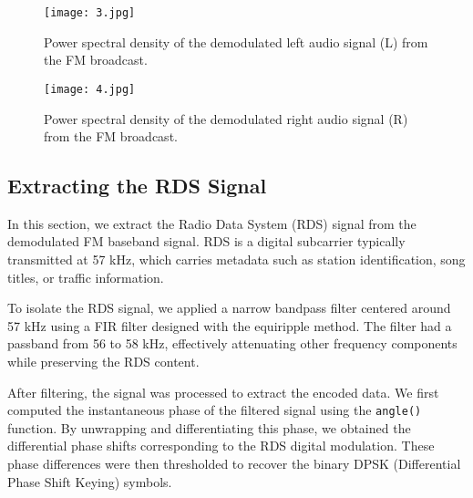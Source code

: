 \documentclass{article}
\begin{document}



\begin{figure}[h!]
    \centering
    \texttt{[image: 3.jpg]}
    \caption{Power spectral density of the demodulated left audio signal (L) from the FM broadcast.}
    \label{fig:L_psd}
\end{figure}

\begin{figure}[h!]
    \centering
    \texttt{[image: 4.jpg]}
    \caption{Power spectral density of the demodulated right audio signal (R) from the FM broadcast.}
    \label{fig:R_psd}
\end{figure}
\subsection*{Extracting the RDS Signal}

In this section, we extract the Radio Data System (RDS) signal from the demodulated FM baseband signal. RDS is a digital subcarrier typically transmitted at 57 kHz, which carries metadata such as station identification, song titles, or traffic information.

To isolate the RDS signal, we applied a narrow bandpass filter centered around 57 kHz using a FIR filter designed with the equiripple method. The filter had a passband from 56 to 58 kHz, effectively attenuating other frequency components while preserving the RDS content.

After filtering, the signal was processed to extract the encoded data. We first computed the instantaneous phase of the filtered signal using the \texttt{angle()} function. By unwrapping and differentiating this phase, we obtained the differential phase shifts corresponding to the RDS digital modulation. These phase differences were then thresholded to recover the binary DPSK (Differential Phase Shift Keying) symbols.
\end{document}
